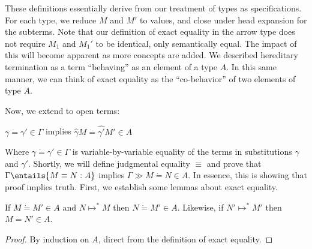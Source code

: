 \documentclass[letterpaper]{article}
\begin{document}
These definitions essentially derive from our treatment of types as specifications. For each type, we reduce $M$ and $M'$ to values, and close under head expansion for the subterms.
Note that our definition of exact equality in the arrow type does not require $M_1$ and $M_1'$ to be identical, only semantically equal.
The impact of this will become apparent as more concepts are added. We described hereditary termination as a term ``behaving'' as an element of a type $A$.
In this same manner, we can think of exact equality as the ``co-behavior'' of two elements of type $A$.

Now, we extend to open terms:


\begin{definition}[$\Gamma \gg M \dot{=} M' \in A$]
    $\gamma \dot{=} \gamma' \in \Gamma$ implies $\hat{\gamma} M \dot{=} \hat{\gamma'} M' \in A$
\end{definition}

Where $\gamma \dot{=} \gamma' \in \Gamma$ is variable-by-variable equality of the terms in substitutions $\gamma$ and $\gamma'$.
Shortly, we will define judgmental equality $\equiv$ and prove that $\Gamma \entails{M \equiv N : A}$ implies $\Gamma \gg M \dot{=} N \in A$.
In essence, this is showing that proof implies truth. First, we establish some lemmas about exact equality.

\begin{lemma}\label{lem:headexpansion}
    If $M \dot{=} M' \in A$ and $N \mapsto^* M$ then $N \dot{=} M' \in A$. Likewise, if $N' \mapsto^* M'$ then $M \dot{=} N' \in A$.
\end{lemma}
\begin{proof}
By induction on $A$, direct from the definition of exact equality.
\end{proof}
\end{document}
